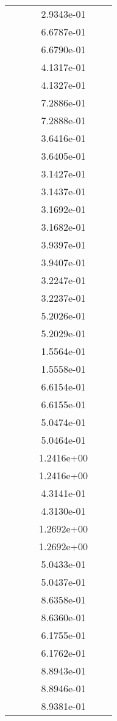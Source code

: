\begin{xltabular}{\textwidth}{r|rS[table-format=1.3e+2]S[table-format=1.4e+2]S[table-format=1.4e+2]S[table-format=-1.5]}
&  &  & 2.9343e-01 & & \\
&  &  & 6.6787e-01 & & \\
&  &  & 6.6790e-01 & & \\
&  &  & 4.1317e-01 & & \\
&  &  & 4.1327e-01 & & \\
&  &  & 7.2886e-01 & & \\
&  &  & 7.2888e-01 & & \\
&  &  & 3.6416e-01 & & \\
&  &  & 3.6405e-01 & & \\
&  &  & 3.1427e-01 & & \\
&  &  & 3.1437e-01 & & \\
&  &  & 3.1692e-01 & & \\
&  &  & 3.1682e-01 & & \\
&  &  & 3.9397e-01 & & \\
&  &  & 3.9407e-01 & & \\
&  &  & 3.2247e-01 & & \\
&  &  & 3.2237e-01 & & \\
&  &  & 5.2026e-01 & & \\
&  &  & 5.2029e-01 & & \\
&  &  & 1.5564e-01 & & \\
&  &  & 1.5558e-01 & & \\
&  &  & 6.6154e-01 & & \\
&  &  & 6.6155e-01 & & \\
&  &  & 5.0474e-01 & & \\
&  &  & 5.0464e-01 & & \\
&  &  & 1.2416e+00 & & \\
&  &  & 1.2416e+00 & & \\
&  &  & 4.3141e-01 & & \\
&  &  & 4.3130e-01 & & \\
&  &  & 1.2692e+00 & & \\
&  &  & 1.2692e+00 & & \\
&  &  & 5.0433e-01 & & \\
&  &  & 5.0437e-01 & & \\
&  &  & 8.6358e-01 & & \\
&  &  & 8.6360e-01 & & \\
&  &  & 6.1755e-01 & & \\
&  &  & 6.1762e-01 & & \\
&  &  & 8.8943e-01 & & \\
&  &  & 8.8946e-01 & & \\
&  &  & 8.9381e-01 & & \\

\end{xltabular}
